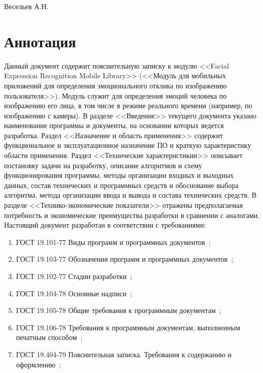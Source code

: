 \documentclass[a4paper,12pt]{article}
\begin{document}
    {Весельев А.Н.}
    \annotation
    \section*{Аннотация}
    Данный документ содержит пояснительную записку к модулю <<Facial Expression Recognition Mobile Library>> (<<Модуль для мобильных приложений для определения эмоционального отклика по изображению пользователя>>).
    Модуль служит для определения эмоций человека по изображению его лица, в том числе в режиме реального времени (например, по изображению с камеры).
    В разделе <<Введение>> текущего документа указано наименование программы и документы, на основании которых ведется разработка.
    Раздел <<Назначение и область применения>> содержит функциональное и эксплуатационное назначение ПО и краткую характеристику области применения.
    Раздел <<Технические характеристикии>> описывает постановку задачи на разработку, описание алгоритмов и схему функционирования программы, методы организации входных и выходных данных, состав технических и программных средств и обоснование выбора алгоритма, метода организации ввода и вывода и состава технических средств.
    В разделе <<Технико-экономические показатели>> отражены предполагаемая потребность и экономические преимущества разработки в сравнении с аналогами.
    Настоящий документ разработан в соответствии с требованиями:
    \begin{enumerate}
        \item ГОСТ 19.101-77 Виды программ и программных документов~\cite{gost1};
        \item ГОСТ 19.103-77 Обозначения программ и программных документов~\cite{gost2};
        \item ГОСТ 19.102-77 Стадии разработки~\cite{gost3};
        \item ГОСТ 19.104-78 Основные надписи~\cite{gost4};
        \item ГОСТ 19.105-78 Общие требования к программным документам~\cite{gost5};
        \item ГОСТ 19.106-78 Требования к программным документам, выполненным печатным способом~\cite{gost6};
        \item ГОСТ 19.404-79 Пояснительная записка. Требования к содержанию и оформлению~\cite{gost7};
    \end{enumerate}
    \newpage
\end{document}
